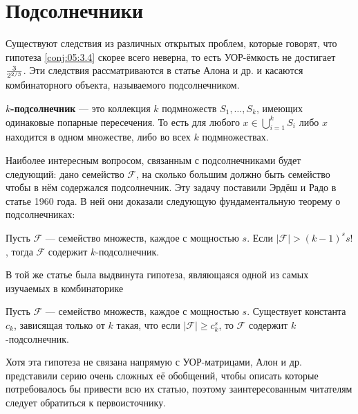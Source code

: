 \section{Подсолнечники}

Существуют следствия из различных открытых проблем, которые говорят, что гипотеза \ref{conj:05:3.4} скорее всего неверна, то есть УОР-ёмкость не достигает ${3 \over 2^{2 / 3}}$.
Эти следствия рассматриваются в статье Алона и др. \cite{Alon11} и касаются комбинаторного объекта, называемого подсолнечником.

\begin{definition}
  \textbf{$k$-подсолнечник} --- это коллекция $k$ подмножеств $S_1, \dotsc, S_k$, имеющих одинаковые попарные пересечения. То есть для любого $x \in \bigcup_{i=1}^k S_i$ либо $x$ находится в одном множестве, либо во всех $k$ подмножествах.
\end{definition}

Наиболее интересным вопросом, связанным с подсолнечниками будет следующий: дано семейство $\mathcal{F}$, на сколько большим должно быть семейство чтобы в нём содержался подсолнечник. Эту задачу поставили Эрдёш и Радо в статье 1960 года. В ней они доказали следующую фундаментальную теорему о подсолнечниках:
\begin{theorem}
  Пусть $\mathcal{F}$ --- семейство множеств, каждое с мощностью $s$. Если $|\mathcal{F}| > (k-1)^s s!$, тогда $\mathcal{F}$ содержит $k$-подсолнечник.
\end{theorem}
В той же статье была выдвинута гипотеза, являющаяся одной из самых изучаемых в комбинаторике
\begin{conj}
  Пусть $\mathcal{F}$ --- семейство множеств, каждое с мощностью $s$. Существует константа $c_k$, зависящая только от $k$ такая, что если $|\mathcal{F}| \geq c_k^s$, то $\mathcal{F}$ содержит $k$-подсолнечник.
\end{conj}

Хотя эта гипотеза не связана напрямую с УОР-матрицами, Алон и др. \cite{Alon11} представили серию очень сложных её обобщений, чтобы описать которые потребовалось бы привести всю их статью, поэтому заинтересованным читателям следует обратиться к первоисточнику.
